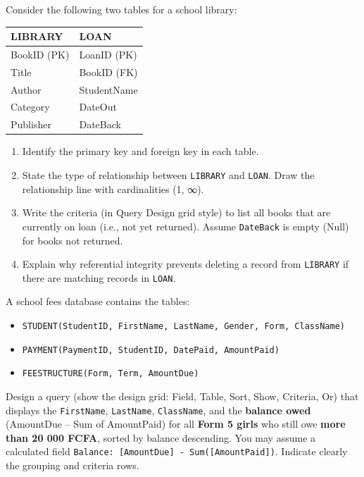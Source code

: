 \documentclass[11pt]{article}
\newcounter{popsec}
\newcounter{popsub}
\newcommand{\courssub}[1]{%
  \stepcounter{popsub}%
  \par\vspace{9pt}\noindent{\popxbold\fontsize{11.5}{13}\selectfont\color{popink}{\color{poporange}\thepopsec.\thepopsub}\hspace{6pt}#1}\par\nopagebreak\vspace{4pt}
}
\begin{document}
\courssub{I practise}

\begin{exercice}
Consider the following two tables for a school library:
\begin{center}
\begin{tabular}{|l|l|}
\hline
\textbf{LIBRARY} & \textbf{LOAN} \\
\hline
BookID (PK) & LoanID (PK) \\
Title & BookID (FK) \\
Author & StudentName \\
Category & DateOut \\
Publisher & DateBack \\
\hline
\end{tabular}
\end{center}
\begin{enumerate}
\item Identify the primary key and foreign key in each table.
\item State the type of relationship between \texttt{LIBRARY} and \texttt{LOAN}. Draw the relationship line with cardinalities (1, ∞).
\item Write the criteria (in Query Design grid style) to list all books that are currently on loan (i.e., not yet returned). Assume \texttt{DateBack} is empty (Null) for books not returned.
\item Explain why referential integrity prevents deleting a record from \texttt{LIBRARY} if there are matching records in \texttt{LOAN}.
\end{enumerate}
\end{exercice}

\begin{exercice}
A school fees database contains the tables:
\begin{itemize}
\item \texttt{STUDENT(StudentID, FirstName, LastName, Gender, Form, ClassName)}
\item \texttt{PAYMENT(PaymentID, StudentID, DatePaid, AmountPaid)}
\item \texttt{FEESTRUCTURE(Form, Term, AmountDue)}
\end{itemize}
Design a query (show the design grid: Field, Table, Sort, Show, Criteria, Or) that displays the \texttt{FirstName}, \texttt{LastName}, \texttt{ClassName}, and the \textbf{balance owed} (AmountDue -- Sum of AmountPaid) for all \textbf{Form 5 girls} who still owe \textbf{more than 20 000 FCFA}, sorted by balance descending. You may assume a calculated field \texttt{Balance: [AmountDue] - Sum([AmountPaid])}. Indicate clearly the grouping and criteria rows.
\end{exercice}
\end{document}
